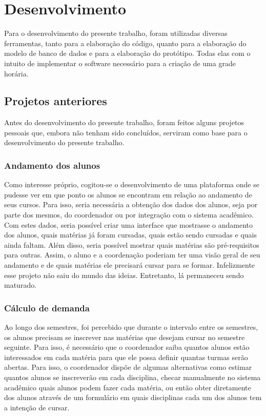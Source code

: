 \chapter{Desenvolvimento} %


Para o desenvolvimento do presente trabalho, foram utilizadas diversas ferramentas, tanto para a elaboração do código, quanto para a elaboração do modelo de banco de dados e para a elaboração do protótipo. Todas elas com o intuito de implementar o software necessário para a criação de uma grade horária.

\section{Projetos anteriores} %

Antes do desenvolvimento do presente trabalho, foram feitos alguns projetos pessoais que, embora não tenham sido concluídos, serviram como base para o desenvolvimento do presente trabalho.

\subsection{Andamento dos alunos} %

Como interesse próprio, cogitou-se o desenvolvimento de uma plataforma onde se pudesse ver em que ponto os alunos se encontram em relação ao andamento de seus cursos. Para isso, seria necessária a obtenção dos dados dos alunos, seja por parte dos mesmos, do coordenador ou por integração com o sistema acadêmico. Com estes dados, seria possível criar uma interface que mostrasse o andamento dos alunos, quais matérias já foram cursadas, quais estão sendo cursadas e quais ainda faltam. Além disso, seria possível mostrar quais matérias são pré-requisitos para outras. Assim, o aluno e a coordenação poderiam ter uma visão geral de seu andamento e de quais matérias ele precisará cursar para se formar. Infelizmente esse projeto não saiu do mundo das ideias. Entretanto, lá permaneceu sendo maturado.

\subsection{Cálculo de demanda} %

Ao longo dos semestres, foi percebido que durante o intervalo entre os semestres, os alunos precisam se inscrever nas matérias que desejam cursar no semestre seguinte. Para isso, é necessário que o coordenador saiba quantos alunos estão interessados em cada matéria para que ele possa definir quantas turmas serão abertas. Para isso, o coordenador dispõe de algumas alternativas como estimar quantos alunos se inscreverão em cada disciplina, checar manualmente no sistema acadêmico quais alunos podem fazer cada matéria, ou então obter diretamente dos alunos através de um formulário em quais disciplinas cada um dos alunos tem a intenção de cursar.

